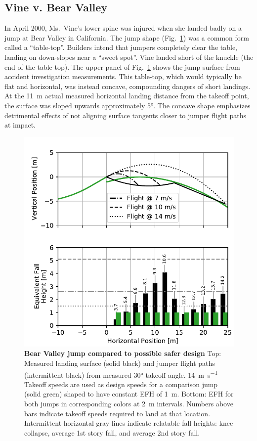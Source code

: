 \documentclass[smallextended]{svjour3}       %
\begin{document}
\subsection{Vine v. Bear Valley}
\label{sec:vine}
%
In April 2000, Ms.~Vine's lower spine was injured when she landed badly on a
jump at Bear Valley in California. The jump shape
(Fig.~\ref{fig:vine-v-bear-valley}) was a common form called a ``table-top''.
Builders intend that jumpers completely clear the table, landing on down-slopes
near a ``sweet spot''.  Vine landed short of the knuckle (the end of the
table-top). The upper panel of Fig.~\ref{fig:vine-v-bear-valley} shows the jump
surface from accident investigation measurements. This table-top, which would
typically be flat and horizontal, was instead concave, compounding dangers of
short landings. At the 11~\si{\meter} actual measured horizontal landing
distance from the takeoff point, the surface was sloped upwards approximately
5\si{\degree}. The concave shape emphasizes detrimental effects of not aligning
surface tangents closer to jumper flight paths at impact.
%
\begin{figure}
  \centering
  \includegraphics[width=\columnwidth]{figures/vine-v-bear-valley.pdf}
  \caption{\textbf{Bear Valley jump compared to possible safer design}
  Top: Measured landing surface (solid black) and jumper flight paths
  (intermittent black) from measured 30\si{\degree} takeoff angle.
  14~\si{\meter\per\second} Takeoff speeds are used as design speeds \cite{Levy2015} for a
  comparison jump (solid green) shaped to have constant EFH of 1~\si{\meter}.
  Bottom: EFH for both jumps in corresponding
  colors at 2~\si{\meter} intervals. Numbers above bars indicate
  takeoff speeds required to land at that location.
  Intermittent horizontal gray lines indicate relatable fall heights: knee
  collapse, average 1st story fall, and average 2nd story fall.
  }
  \label{fig:vine-v-bear-valley}
\end{figure}
\end{document}
